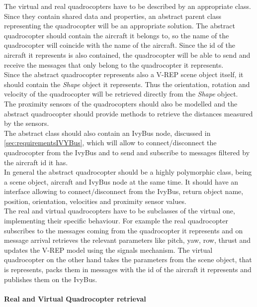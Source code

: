     The virtual and real quadrocopters have to be described by an appropriate class. \\
    Since they contain shared data and properties, an abstract parent class representing the quadrocopter will be an appropriate solution. The abstract quadrocopter should contain the aircraft it belongs to, so the name of the quadrocopter will coincide with the name of the aircraft. 
    Since the id of the aircraft it represents is also contained, the quadrocopter will be able to send and receive the messages that only belong to the quadrocopter it represents. \\
    Since the abstract quadrocopter represents also a V-REP scene object itself, it should contain the \textit{Shape} object it represents. Thus the orientation, rotation and velocity of the quadrocopter will be retrieved directly from the \textit{Shape} object.\\
    The proximity sensors of the quadrocopters should also be modelled and the abstract quadrocopter should provide methods to retrieve the distances measured by the sensors.\\
    The abstract class should also contain an IvyBus node, discussed in \ref{sec:requirementsIVYBus}, which will allow to connect/disconnect the quadrocopter from the IvyBus and to send and subscribe to messages filtered by the aircraft id it has. \\
    In general the abstract quadrocopter should be a highly polymorphic class, being a scene object, aircraft and IvyBus node at the same time. 
    It should have an interface allowing to connect/disconnect from the IvyBus, return object name, position, orientation, velocities and proximity sensor values. \\
    The real and virtual quadrocopters have to be subclasses of the virtual one, implementing their specific behaviour. 
    For example the real quadrocopter subscribes to the messages coming from the quadrocopter it represents and on message arrival retrieves the relevant parameters like pitch, yaw, row, thrust and updates the V-REP model using the signals mechanism. 
    The virtual quadrocopter on the other hand takes the parameters from the scene object, that is represents, packs them in messages with the id of the aircraft it represents and publishes them on the IvyBus.
    
    \paragraph{Real and Virtual Quadrocopter retrieval}
    
